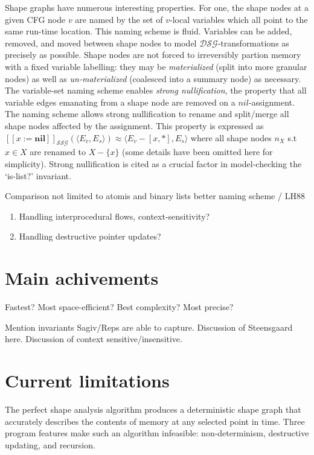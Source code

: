 \documentclass{article}
\begin{document}
Shape graphs have numerous interesting properties. For one, the shape nodes
at a given CFG node $v$ are named by the set of $v$-local variables which
all point to the same run-time location. This naming scheme is fluid.
Variables can be added, removed, and moved between shape nodes to model
$\mathcal{DSG}$-transformations as precisely as possible. Shape nodes are
not forced to irreversibly partion memory with a fixed variable labelling:
they may be \textit{materialized} (split into more granular nodes) as well
as \textit{un-materialized} (coalesced into a summary node) as necessary.
The variable-set naming scheme enables \textit{strong nullification}, the
property that all variable edges emanating from a shape node are removed on
a $nil$-assignment. The naming scheme allows strong nullification to rename
and split/merge all shape nodes affected by the assignment. This property is
expressed as $[\![x := \textbf{nil}]\!]_{\mathcal{SSG}}(\langle E_v, E_s
\rangle) \approx \langle E_v - [x, *], E_s \rangle$ where all shape nodes
$n_X$ s.t $x \in X$ are renamed to $X - \{x\}$ (some details have been
omitted here for simplicity).  Strong nullification is cited as a crucial
factor in model-checking the `is-list?' invariant.  

Comparison
    not limited to atomis and binary lists 
    better naming scheme / LH88

\begin{enumerate}[1.]
    \item Handling interprocedural flows, context-sensitivity?
    \item Handling destructive pointer updates?
\end{enumerate}

\section{Main achivements}

Fastest?
Most space-efficient?
Best complexity?
Most precise?

Mention invariants Sagiv/Reps are able to capture.
Discussion of Steensgaard here.
Discussion of context sensitive/insensitive.

\section{Current limitations}

The perfect shape analysis algorithm produces a deterministic shape graph
that accurately describes the contents of memory at any selected point in
time. Three program features make such an algorithm infeasible:
non-determinism, destructive updating, and recursion. 
\end{document}
